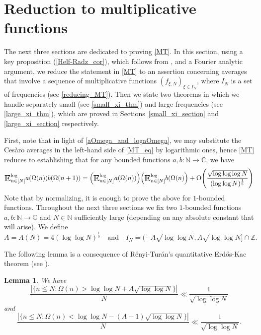 \documentclass[letter,11pt]{article}
\theoremstyle{plain} %
\newtheorem{lemma}[theorem]{Lemma}
\theoremstyle{definition} %
\theoremstyle{plain}
\theoremstyle{plain}
\theoremstyle{plain}
\numberwithin{equation}{section}
\newcommand{\Cesaro}{Ces\`{a}ro}
\newcommand{\Erdos}{Erd\H{o}s}
\newcommand{\Oh}{{\mathrm O}}
\newcommand{\N}{\mathbb{N}}
\newcommand{\Z}{\mathbb{Z}}
\newcommand{\C}{\mathbb{C}}
\renewcommand{\leq}{\leqslant}
\newcommand{\E}{\raisebox{-0.4ex}{\scalebox{1.4}[1.3]{$\mathbb{E}$}}}
\newcommand{\logE}{{\E}^{\log}}
\newcommand{\1}{\mathbbm{1}}
\newcommand{\f}{f_{\xi,N}}
\begin{document}
\section{Reduction to multiplicative functions}\label{reduction_section}

The next three sections are dedicated to proving \cref{MT}. In this section, using a key proposition (\cref{Helf-Radz_cor}), which follows from \cite[Corollary 1.4]{helf_radz}, and a Fourier analytic argument, we reduce the statement in \cref{MT} to an assertion concerning averages that involve a sequence of multiplicative functions $(\f)_{\xi\in I_N}$, where $I_N$ is a set of frequencies (see \cref{reducing_MT}). Then we state two theorems in which we handle separately small (see \cref{small_xi_thm}) and large frequencies (see \cref{large_xi_thm}), which are proved in Sections~\ref{small_xi_section} and \ref{large_xi_section} respectively. 

First, note that in light of \cref{aOmega_and_logaOmega}, we may substitute the \Cesaro{} averages in the left-hand side of \eqref{MT_eq} by logarithmic ones, hence \cref{MT} reduces to establishing that for any bounded functions $a,b\colon\N\to\C$, we have
\begin{equation}\label{MT_eq_with_log}
    \logE_{n\in[N]} a(\Omega(n))b(\Omega(n+1)) 
    = \Big(\logE_{n\in[N]}a(\Omega(n))\Big)\Big(\logE_{n\in[N]}b(\Omega(n)\Big)
    + \Oh\Bigg(\frac{\sqrt{\log\log\log{N}}}{(\log\log{N})^\frac{1}{6}}\Bigg)
\end{equation}
Note that by normalizing, it is enough to prove the above for $1$-bounded functions. Throughout the next three sections we fix two $1$-bounded functions $a,b\colon\N\to\C$ and $N\in\N$ sufficiently large (depending on any absolute constant that will arise).
We define 
\begin{equation}\label{I_N_def}
    A = A(N) = 4(\log\log{N})^{\frac{1}{9}}
    \quad\text{and}\quad
    I_N = (-A\sqrt{\log\log{N}},A\sqrt{\log\log{N}}]\cap\Z.
\end{equation}

The following lemma is a consequence of R\'enyi-Tur\'an's quantitative \Erdos-Kac theorem (see \cite[Theorem 2]{renyi-turan}).

\begin{lemma}\label{renyi-turan_cor}
    We have
    $$\frac{|\{n\leq N\colon \Omega(n)>\log\log{N}+A\sqrt{\log\log{N}}\}|}{N}
    \ll \frac{1}{{\sqrt{\log\log{N}}}}$$
    and
    $$\frac{|\{n\leq N\colon \Omega(n)<\log\log{N}-(A-1)\sqrt{\log\log{N}}\}|}{N}
    \ll \frac{1}{{\sqrt{\log\log{N}}}}.$$    
\end{lemma}
\end{document}
